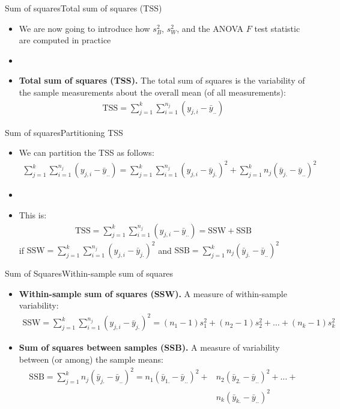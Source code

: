 \documentclass[xcolor=dvipsnames]{beamer}
\begin{document}
\begin{frame}{Sum of squares}{Total sum of squares (TSS)}
	\begin{itemize}
		\item We are now going to introduce how $s^2_B$, $s^2_W$, and the ANOVA $F$ test statistic are computed in practice 
		\item[]
		\item \textbf{Total sum of squares (TSS).} The total sum of squares is the variability of the sample measurements about the overall mean (of all measurements):
		\begin{gather*}
			\text{TSS} = \sum_{j=1}^{k} \sum_{i = 1}^{n_j}\left(y_{j,i} - \bar{y}_{..}\right)
		\end{gather*}
	\end{itemize}
\end{frame}

\begin{frame}{Sum of squares}{Partitioning TSS}
	\begin{itemize}
		\item We can partition the TSS as follows:
		\begin{gather*}
			\sum_{j=1}^{k} \sum_{i = 1}^{n_j}\left(y_{j,i} - \bar{y}_{..}\right) = \sum_{j=1}^{k}\sum_{i = 1}^{n_j} (y_{j,i}-\bar{y}_{j.})^2 + \sum_{j=1}^k n_j (\bar{y}_{j.} - \bar{y}_{..})^2
		\end{gather*}
		\item[]
		\item This is:
		\begin{gather*}
			\text{TSS} =\sum_{j=1}^{k} \sum_{i = 1}^{n_j}\left(y_{j,i} - \bar{y}_{..}\right) = \text{SSW} + \text{SSB}
		\end{gather*}
		if $\text{SSW} = \sum_{j=1}^{k}\sum_{i = 1}^{n_j} (y_{j,i}-\bar{y}_{j.})^2$ and $\text{SSB}= \sum_{j=1}^k n_j (\bar{y}_{j.} - \bar{y}_{..})^2$
	\end{itemize}
\end{frame}

\begin{frame}{Sum of Squares}{Within-sample sum of squares}
	\begin{itemize}
		\item \textbf{Within-sample sum of squares (SSW).} A measure of within-sample variability:
		\begin{gather*}
			\text{SSW} = \sum_{j=1}^{k}\sum_{i = 1}^{n_j} (y_{j,i}-\bar{y}_{j.})^2 = (n_1-1)s_1^2 + (n_2-1)s_2^2 + \hdots + (n_k-1)s_k^2
		\end{gather*}
		\item \textbf{Sum of squares between samples (SSB).} A measure of variability between (or among) the sample means:
		\begin{align*}
			\text{SSB} =\sum_{j=1}^k n_j (\bar{y}_{j.} - \bar{y}_{..})^2 = n_1 (\bar{y}_{1.}-\bar{y}_{..})^2 + &n_2 (\bar{y}_{2.}-\bar{y}_{..})^2 + \hdots + \\ &n_k (\bar{y}_{k.}-\bar{y}_{..})^2
		\end{align*}
	\end{itemize}
\end{frame}
\end{document}
